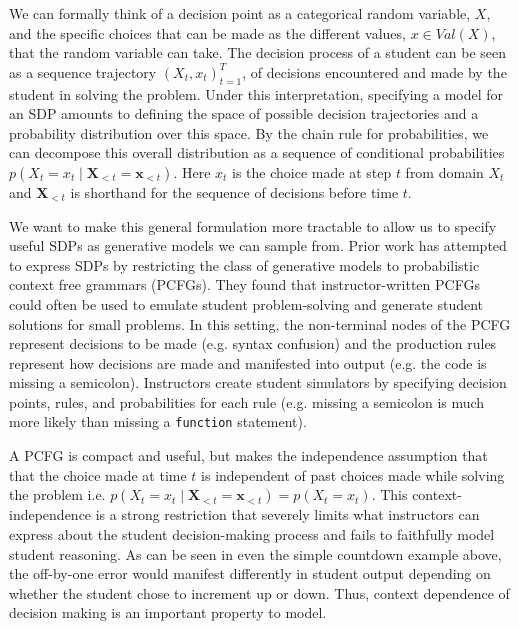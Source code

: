 We can formally think of a decision point as a categorical random variable, $X$, and the specific choices that can be made as the different values, $x \in Val(X)$, that the random variable can take. The decision process of a student can be seen as a sequence trajectory $(X_t, x_t)_{t=1}^T$, of decisions encountered and made by the student in solving the problem.
Under this interpretation, specifying a model for an SDP amounts to defining the space of possible decision trajectories and a probability distribution over this space. By the chain rule for probabilities, we can decompose this overall distribution as a sequence of conditional probabilities
$p(X_t = x_t \mid \mathbf{X}_{<t} = \mathbf{x}_{<t})$.
Here $x_t$ is the choice made at step $t$ from domain $X_t$ and
$\mathbf{X}_{<t}$ is shorthand for the sequence of decisions before time $t$. 

We want to make this general formulation more tractable to allow us to specify useful SDPs as generative models we can sample from. Prior work \cite{wu2018zero} has attempted to express SDPs by restricting the class of generative models to probabilistic context free grammars (PCFGs).
They found that instructor-written PCFGs could often be used to emulate student problem-solving and generate student solutions for small problems.
In this setting, the non-terminal nodes of the PCFG represent decisions to be made (e.g. syntax confusion) and the production rules represent how decisions are made and manifested into output (e.g. the code is missing a semicolon). Instructors create student simulators by specifying decision points, rules, and probabilities for each rule (e.g. missing a semicolon is much more likely than missing a \texttt{function} statement). 


A PCFG is compact and useful, but makes the independence assumption that that the choice made at time $t$ is independent of past choices made while solving the problem i.e. $p(X_t = x_t \mid \mathbf{X}_{<t} = \mathbf{x}_{<t}) = p(X_t = x_t)$.
This context-independence is a strong restriction that severely limits what instructors can express about the student decision-making process and fails to faithfully model student reasoning. As can be seen in even the simple countdown example above, the off-by-one error would manifest differently in student output depending on whether the student chose to increment up or down. Thus, context dependence of decision making is an important property to model.

